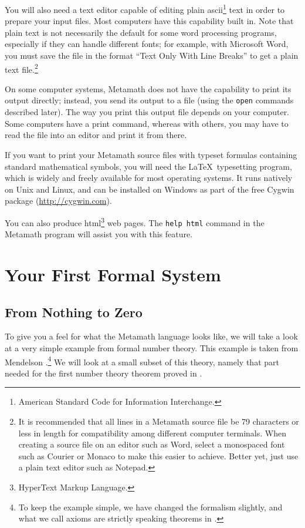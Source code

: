You will also need a text editor capable of editing plain
{\sc ascii}\footnote{American Standard Code for Information Interchange.} text
in order to prepare your input files.  Most computers
have this capability built in.  Note that plain text is not necessarily the
default for some word processing programs, especially if
they can handle different fonts; for example, with Microsoft Word, you must save the file in the format ``Text Only With Line
Breaks'' to get a plain text file.\footnote{It is
recommended that all lines in a Metamath source file be 79 characters or less
in length for compatibility among different computer terminals.  When creating
a source file on an editor such as Word, select a monospaced
font such as Courier or
Monaco to make this easier to achieve.  Better yet,
just use a plain text editor such as Notepad.}

On some computer systems, Metamath does not have the capability to print
its output directly; instead, you send its output to a file (using the
\texttt{open} commands described later).  The way you print this output
file depends on your computer. Some computers have a
print command, whereas with others, you may have to read the file into
an editor and print it from there.

If you want to print your Metamath source files with typeset formulas
containing standard mathematical symbols, you will need the \LaTeX\
typesetting program, which is widely and freely
available for most operating systems.  It runs natively on Unix and
Linux, and can be installed on Windows as part of the free Cygwin
package (\url{http://cygwin.com}).

You can also produce {\sc html}\footnote{HyperText Markup Language.}
web pages.  The {\tt help html} command in the Metamath program will
assist you with this feature.

\section{Your First Formal System}\label{start}
\subsection{From Nothing to Zero}\label{startf}

To give you a feel for what the Metamath language looks like,
we will take a look at a very simple example from formal number
theory.  This example is taken from
Mendelson \cite[p. 123]{Mendelson}.\footnote{To keep
the example simple, we have changed the formalism slightly, and what we call
axioms\index{axiom} are strictly speaking theorems\index{theorem} in
\cite{Mendelson}.}  We will look at a small subset of this theory, namely that
part needed for the first number theory theorem proved in \cite{Mendelson}.

